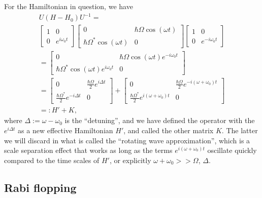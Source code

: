 \documentclass[aps,twocolumn,prb,floatfix,amsmath,amssymb,groupedaddress]{revtex4}
\begin{document}
For the Hamiltonian in question, we have
\begin{multline}
U(H-H_0)U^{-1} = \\
\begin{bmatrix}
1 & 0 \\
0 & e^{i\omega_0 t}
\end{bmatrix}
\begin{bmatrix}
0 & \hbar\Omega \cos(\omega t) \\
\hbar \Omega^* \cos(\omega t) & 0 
\end{bmatrix}
\begin{bmatrix}
1 & 0 \\
0 & e^{-i\omega_0 t}
\end{bmatrix}\\
= \begin{bmatrix}
0 & \hbar\Omega \cos(\omega t) e^{-i\omega_0 t} \\
\hbar \Omega^* \cos(\omega t) e^{i\omega_0 t} & 0 
\end{bmatrix} \\
= \begin{bmatrix}
0 & \frac{\hbar\Omega}{2} e^{i\Delta t} \\
\frac{\hbar\Omega^*}{2} e^{-i\Delta t} & 0 
\end{bmatrix} + \begin{bmatrix}
0 & \frac{\hbar\Omega}{2} e^{-i(\omega+\omega_0) t} \\
\frac{\hbar\Omega^*}{2} e^{i(\omega+\omega_0) t} & 0 
\end{bmatrix}\\
=: H' + K,
\end{multline}
where $\Delta:=\omega-\omega_0$ is the ``detuning'', and we have defined the operator with the $e^{i\Delta t}$ as a new effective Hamiltonian $H'$, and called the other matrix $K$.  The latter we will discard in what is called the ``rotating wave approximation'', which is a scale separation effect that works as long as the terms $e^{i(\omega + \omega_0) t}$ oscillate quickly compared to the time scales of $H'$, or explicitly $\omega+\omega_0 >> \Omega$, $\Delta$.  

\subsection{Rabi flopping}
\end{document}
